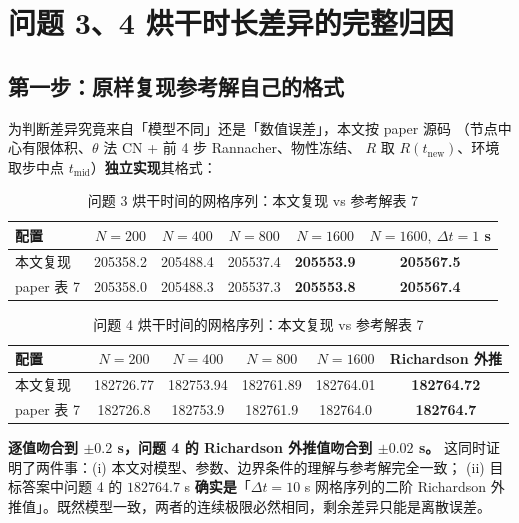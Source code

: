 \documentclass[11pt,a4paper]{article}
\theoremstyle{definition}
\begin{document}
\section{问题 3、4 烘干时长差异的完整归因}

\subsection{第一步：原样复现参考解自己的格式}

为判断差异究竟来自「模型不同」还是「数值误差」，本文按 paper 源码
（节点中心有限体积、$\theta$ 法 CN + 前 4 步 Rannacher、物性冻结、
$R$ 取 $R(t_{\text{new}})$、环境取步中点 $t_{\text{mid}}$）\textbf{独立实现}其格式：

\begin{table}[H]
\centering
\small
\caption{问题 3 烘干时间的网格序列：本文复现 vs 参考解表 7}
\begin{tabular}{@{}lccccc@{}}
\toprule
配置 & $N=200$ & $N=400$ & $N=800$ & $N=1600$ & $N=1600,\ \Delta t=1$ s \\
\midrule
本文复现 & 205358.2 & 205488.4 & 205537.4 & \textbf{205553.9} & \textbf{205567.5} \\
paper 表 7 & 205358.0 & 205488.3 & 205537.3 & \textbf{205553.8} & \textbf{205567.4} \\
\bottomrule
\end{tabular}
\end{table}

\begin{table}[H]
\centering
\small
\caption{问题 4 烘干时间的网格序列：本文复现 vs 参考解表 7}
\begin{tabular}{@{}lccccc@{}}
\toprule
配置 & $N=200$ & $N=400$ & $N=800$ & $N=1600$ & Richardson 外推 \\
\midrule
本文复现 & 182726.77 & 182753.94 & 182761.89 & 182764.01 & \textbf{182764.72} \\
paper 表 7 & 182726.8 & 182753.9 & 182761.9 & 182764.0 & \textbf{182764.7} \\
\bottomrule
\end{tabular}
\end{table}

\textbf{逐值吻合到 $\pm0.2$ s，问题 4 的 Richardson 外推值吻合到 $\pm0.02$ s。}
这同时证明了两件事：(i) 本文对模型、参数、边界条件的理解与参考解完全一致；
(ii) 目标答案中问题 4 的 $182764.7$ s \textbf{确实是}「$\Delta t=10$ s 网格序列的二阶
Richardson 外推值」。既然模型一致，两者的连续极限必然相同，剩余差异只能是离散误差。
\end{document}

